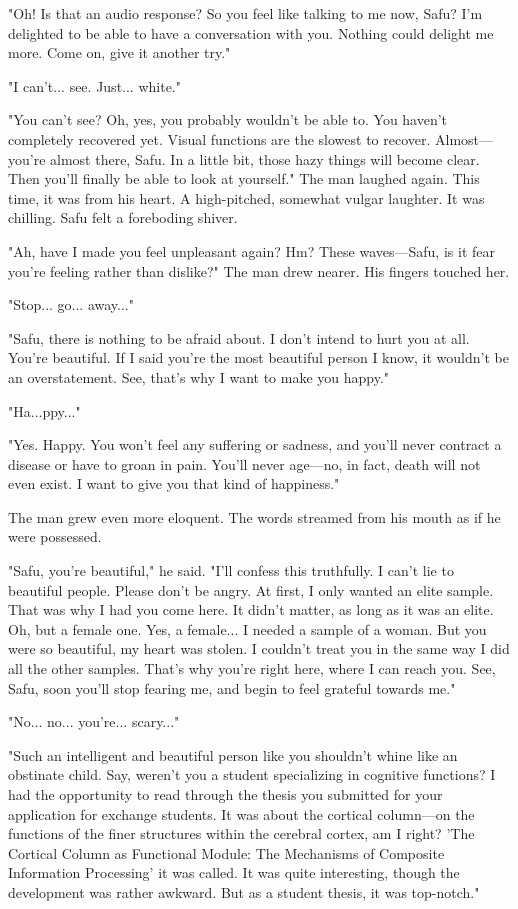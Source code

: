"Oh! Is that an audio response? So you feel like talking to me now,
Safu? I'm delighted to be able to have a conversation with you. Nothing
could delight me more. Come on, give it another try."

"I can't... see. Just... white."

"You can't see? Oh, yes, you probably wouldn't be able to. You haven't
completely recovered yet. Visual functions are the slowest to recover.
Almost---you're almost there, Safu. In a little bit, those hazy things
will become clear. Then you'll finally be able to look at yourself." The
man laughed again. This time, it was from his heart. A high-pitched,
somewhat vulgar laughter. It was chilling. Safu felt a foreboding
shiver.

"Ah, have I made you feel unpleasant again? Hm? These waves---Safu, is it
fear you're feeling rather than dislike?" The man drew nearer. His
fingers touched her.

"Stop... go... away..."

"Safu, there is nothing to be afraid about. I don't intend to hurt you
at all. You're beautiful. If I said you're the most beautiful person I
know, it wouldn't be an overstatement. See, that's why I want to make
you happy."

"Ha...ppy..."

"Yes. Happy. You won't feel any suffering or sadness, and you'll never
contract a disease or have to groan in pain. You'll never age---no, in
fact, death will not even exist. I want to give you that kind of
happiness."

The man grew even more eloquent. The words streamed from his mouth as if
he were possessed.

"Safu, you're beautiful," he said. "I'll confess this truthfully. I
can't lie to beautiful people. Please don't be angry. At first, I only
wanted an elite sample. That was why I had you come here. It didn't
matter, as long as it was an elite. Oh, but a female one. Yes, a
female... I needed a sample of a woman. But you were so beautiful, my
heart was stolen. I couldn't treat you in the same way I did all the
other samples. That's why you're right here, where I can reach you. See,
Safu, soon you'll stop fearing me, and begin to feel grateful towards
me."

"No... no... you're... scary..."

"Such an intelligent and beautiful person like you shouldn't whine like
an obstinate child. Say, weren't you a student specializing in cognitive
functions? I had the opportunity to read through the thesis you
submitted for your application for exchange students. It was about the
cortical column---on the functions of the finer structures within the
cerebral cortex, am I right? 'The Cortical Column as Functional Module:
The Mechanisms of Composite Information Processing' it was called. It
was quite interesting, though the development was rather awkward. But as
a student thesis, it was top-notch."


